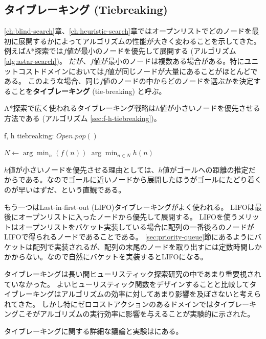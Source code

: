 \documentclass[10pt]{book}
\newcommand{\define}[2]{{\bf #1} (#2) \index{#1}\index{#2}}
\begin{document}
\subsection{タイブレーキング (Tiebreaking)}
\label{sec:tiebreaking}

\ref{ch:blind-search}章、\ref{ch:heuristic-search}章ではオープンリストでどのノードを最初に展開するかによってアルゴリズムの性能が大きく変わることを示してきた。
例えばA*探索では$f$値が最小のノードを優先して展開する (アルゴリズム\ref{alg:astar-search})。
だが、$f$値が最小のノードは複数ある場合がある。特にユニットコストドメインにおいては$f$値が同じノードが大量にあることがほとんどである。
このような場合、同じ$f$値のノードの中からどのノードを選ぶかを決定することを\define{タイブレーキング}{tie-breaking}と呼ぶ。

A*探索で広く使われるタイブレーキング戦略は$h$値が小さいノードを優先させる方法である (アルゴリズム \ref{sec:f-h-tiebreaking})。

\begin{algorithm}
\caption{f, h tiebreaking: $Open.pop()$}
\label{alg:f-h-tiebreaking}
	$N \leftarrow \arg \min_n (f(n))$
	\Return $\arg \min_{n \in N} h(n)$
\end{algorithm}

$h$値が小さいノードを優先させる理由としては、$h$値がゴールへの距離の推定だからである。なのでゴールに近いノードから展開したほうがゴールにたどり着くのが早いはずだ、という直観である。

もう一つはLast-in-first-out (LIFO)タイブレーキングがよく使われる。
LIFOは最後にオープンリストに入ったノードから優先して展開する。
LIFOを使うメリットはオープンリストをバケット実装している場合に配列の一番後ろのノードがLIFOで得られるノードであることである。
\ref{sec:priority-queue}節にあるようにバケットは配列で実装されるが、配列の末尾のノードを取り出すには定数時間しかかからない。なので自然にバケットを実装するとLIFOになる。


タイブレーキングは長い間ヒューリスティック探索研究の中であまり重要視されていなかった。
よいヒューリスティック関数をデザインすることと比較してタイブレーキングはアルゴリズムの効率に対してあまり影響を及ぼさないと考えられてきた。
しかし特にゼロコストアクションのあるドメインではタイブレーキングこそがアルゴリズムの実行効率に影響を与えることが実験的に示された\cite{asai2016tiebreaking}。

タイブレーキングに関する詳細な議論と実験は\cite{asai2016tiebreaking}にある。
\end{document}
